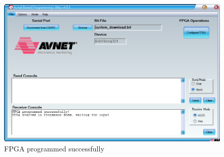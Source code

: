 \begin{figure}[ht]
    \centering
    \includegraphics[scale=0.5]{figures/AVNET.png}
    \caption{FPGA programmed successfully} 
    \label{fig:avprog}
\end{figure}


